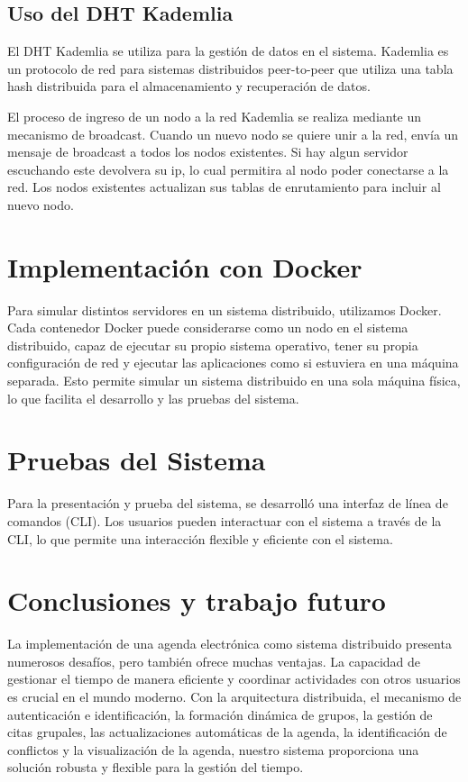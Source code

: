\documentclass[10pt]{article} %
\begin{document}
	\subsection{Uso del DHT Kademlia}
	
	El DHT Kademlia se utiliza para la gestión de datos en el sistema. Kademlia es un protocolo de red para sistemas distribuidos peer-to-peer que utiliza una tabla hash distribuida para el almacenamiento y recuperación de datos. 
	
	El proceso de ingreso de un nodo a la red Kademlia se realiza mediante un mecanismo de broadcast. Cuando un nuevo nodo se quiere unir a la red, envía un mensaje de broadcast a todos los nodos existentes. Si hay algun servidor escuchando este devolvera su ip, lo cual permitira al nodo poder conectarse a la red. Los nodos existentes actualizan sus tablas de enrutamiento para incluir al nuevo nodo. 
	
	\section{Implementación con Docker}
	
	Para simular distintos servidores en un sistema distribuido, utilizamos Docker. Cada contenedor Docker puede considerarse como un nodo en el sistema distribuido, capaz de ejecutar su propio sistema operativo, tener su propia configuración de red y ejecutar las aplicaciones como si estuviera en una máquina separada. Esto permite simular un sistema distribuido en una sola máquina física, lo que facilita el desarrollo y las pruebas del sistema.
	
	\section{Pruebas del Sistema}
	
	Para la presentación y prueba del sistema, se desarrolló una interfaz de línea de comandos (CLI). Los usuarios pueden interactuar con el sistema a través de la CLI, lo que permite una interacción flexible y eficiente con el sistema.
	
	\section{Conclusiones y trabajo futuro}
	
	La implementación de una agenda electrónica como sistema distribuido presenta numerosos desafíos, pero también ofrece muchas ventajas. La capacidad de gestionar el tiempo de manera eficiente y coordinar actividades con otros usuarios es crucial en el mundo moderno. Con la arquitectura distribuida, el mecanismo de autenticación e identificación, la formación dinámica de grupos, la gestión de citas grupales, las actualizaciones automáticas de la agenda, la identificación de conflictos y la visualización de la agenda, nuestro sistema proporciona una solución robusta y flexible para la gestión del tiempo.
	
	 
\end{document}

